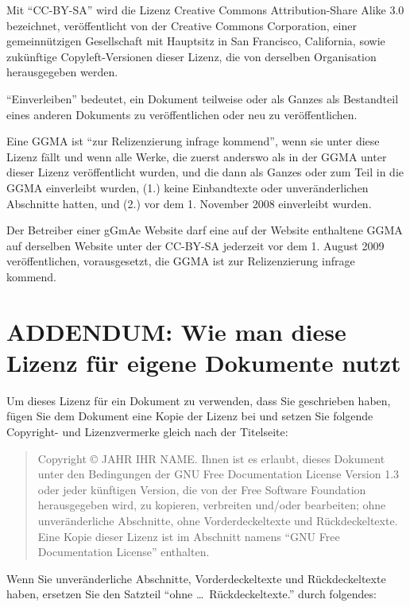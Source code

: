 Mit "`CC-BY-SA"' wird die Lizenz Creative Commons Attribution-Share Alike 3.0 bezeichnet,
veröffentlicht von der Creative Commons Corporation, einer gemeinnützigen
Gesellschaft mit Hauptsitz in San Francisco, California, sowie zukünftige
Copyleft-Versionen dieser Lizenz, die von derselben Organisation herausgegeben werden.

"`Einverleiben"' bedeutet, ein Dokument teilweise oder als Ganzes als Bestandteil 
eines anderen Dokuments zu veröffentlichen oder neu zu veröffentlichen.

Eine GGMA ist "`zur Relizenzierung infrage kommend"', wenn sie unter diese Lizenz fällt
und wenn alle Werke, die zuerst anderswo als in der GGMA unter dieser Lizenz veröffentlicht wurden,
und die dann als Ganzes oder zum Teil in die GGMA einverleibt wurden, 
(1.) keine Einbandtexte oder unveränderlichen Abschnitte hatten,
und (2.) vor dem 1. November 2008 einverleibt wurden.

Der Betreiber einer gGmAe Website darf eine auf der Website enthaltene GGMA 
auf derselben Website unter der CC-BY-SA jederzeit vor dem 1. August 2009 veröffentlichen,
vorausgesetzt, die GGMA ist zur Relizenzierung infrage kommend.

\section*{ADDENDUM: Wie man diese Lizenz für eigene Dokumente nutzt}

Um dieses Lizenz für ein Dokument zu verwenden, dass Sie geschrieben haben, 
fügen Sie dem Dokument eine Kopie der Lizenz bei und setzen Sie
folgende Copyright- und Lizenzvermerke gleich nach der Titelseite:

\bigskip
\begin{quote}
    Copyright \copyright{}  JAHR  IHR NAME.
    Ihnen ist es erlaubt, dieses Dokument unter den Bedingungen der GNU Free Documentation License Version 1.3
    oder jeder künftigen Version, die von der Free Software Foundation herausgegeben wird, zu kopieren,
    verbreiten und/oder bearbeiten; ohne unveränderliche Abschnitte, ohne
    Vorderdeckeltexte und Rückdeckeltexte.
    Eine Kopie dieser Lizenz ist im Abschnitt namens "`GNU
    Free Documentation License"' enthalten.
\end{quote}
\bigskip
    
Wenn Sie unveränderliche Abschnitte, Vorderdeckeltexte und Rückdeckeltexte haben,
ersetzen Sie den Satzteil "`ohne \dots\ Rückdeckeltexte."' durch folgendes:

